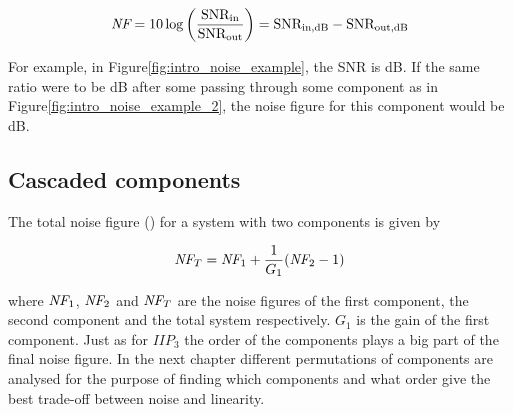 			\begin{equation}
				\emph{NF}=10\log \left(\frac{ \text{SNR}_\text{in} }{ \text{SNR}_\text{out} }\right) = \text{SNR}_\text{in,dB} -\text{SNR}_\text{out,dB}
			\end{equation}

			For example, in Figure\autoref{fig:intro_noise_example}, the SNR is \unit[67]{dB}. If the same ratio were to be \unit[47]{dB} after some passing through some component as in Figure\autoref{fig:intro_noise_example_2}, the noise figure for this component would be \unit[20]{dB}.


		\subsection{Cascaded components}
			The total noise figure (\nf) for a system with two components is given by \autocite{pozar90}

			\begin{equation}
				\emph{NF}_T=\emph{NF}_1+\frac{1}{G_1}(\emph{NF}_2-1)
			\end{equation}

			where $\emph{NF}_1$, $\emph{NF}_2$ and $\emph{NF}_T$ are the noise figures of the first component, the second component and the total system respectively. $G_1$ is the gain of the first component. Just as for $IIP_3$ the order of the components plays a big part of the final noise figure. In the next chapter different permutations of components are analysed for the purpose of finding which components and what order give the best trade-off between noise and linearity.
